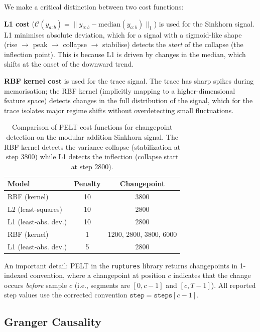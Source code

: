\documentclass[12pt,twoside]{article}
\begin{document}
We make a critical distinction between two cost functions:

\textbf{L1 cost} (\(\mathcal{C}(y_{a:b}) = \|y_{a:b} - \text{median}(y_{a:b})\|_1\))
is used for the Sinkhorn signal. L1 minimises absolute deviation, which for a
signal with a sigmoid-like shape (rise $\to$ peak $\to$ collapse $\to$
stabilise) detects the \emph{start} of the collapse (the inflection point).
This is because L1 is driven by changes in the median, which shifts at the
onset of the downward trend.

\textbf{RBF kernel cost} is used for the trace signal. The trace has sharp
spikes during memorisation; the RBF kernel (implicitly mapping to a
higher-dimensional feature space) detects changes in the full distribution
of the signal, which for the trace isolates major regime shifts without
overdetecting small fluctuations.

\begin{table}[t]
  \centering
  \caption{Comparison of PELT cost functions for changepoint detection on
           the modular addition Sinkhorn signal. The RBF kernel detects the
           variance collapse (stabilization at step 3800) while L1 detects
           the inflection (collapse start at step 2800).}
  \label{tab:pelt_comparison}
  \begin{tabular}{lcc}
    \toprule
    Model & Penalty & Changepoint \\ \midrule
    RBF (kernel) & 10 & 3800 \\
    L2 (least-squares) & 10 & 2800 \\
    L1 (least-abs. dev.) & 10 & 2800 \\
    RBF (kernel) & 1 & 1200, 2800, 3800, 6000 \\
    L1 (least-abs. dev.) & 5 & 2800 \\
    \bottomrule
  \end{tabular}
\end{table}

An important detail: PELT in the \texttt{ruptures} library returns
changepoints in 1-indexed convention, where a changepoint at position $c$
indicates that the change occurs \emph{before} sample $c$ (i.e., segments
are $[0, c-1]$ and $[c, T-1]$). All reported step values use the corrected
convention $\texttt{step} = \texttt{steps}[c-1]$.

\subsection{Granger Causality}
\end{document}
